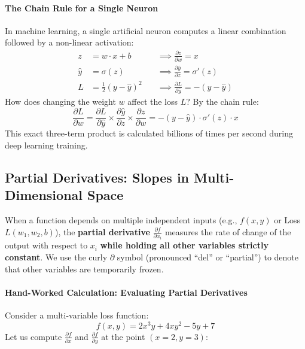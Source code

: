 \paragraph{The Chain Rule for a Single Neuron}
In machine learning, a single artificial neuron computes a linear combination followed by a non-linear activation:
\begin{align*}
z &= w \cdot x + b \quad &\implies \frac{\partial z}{\partial w} = x \\
\hat{y} &= \sigma(z) \quad &\implies \frac{\partial \hat{y}}{\partial z} = \sigma'(z) \\
L &= \frac{1}{2}(y - \hat{y})^2 \quad &\implies \frac{\partial L}{\partial \hat{y}} = -(y - \hat{y})
\end{align*}
How does changing the weight $w$ affect the loss $L$? By the chain rule:
\begin{equation}
\frac{\partial L}{\partial w} = \frac{\partial L}{\partial \hat{y}} \times \frac{\partial \hat{y}}{\partial z} \times \frac{\partial z}{\partial w} = -(y - \hat{y}) \cdot \sigma'(z) \cdot x\label{eq:neuron_backprop}
\end{equation}
This exact three-term product is calculated billions of times per second during deep learning training.

\subsection{Partial Derivatives: Slopes in Multi-Dimensional Space}

\begin{keyidea}
When a function depends on multiple independent inputs (e.g., $f(x, y)$ or Loss $L(w_1, w_2, b)$), the \textbf{partial derivative} $\frac{\partial f}{\partial x_i}$ measures the rate of change of the output with respect to $x_i$ \textbf{while holding all other variables strictly constant}. We use the curly $\partial$ symbol (pronounced ``del'' or ``partial'') to denote that other variables are temporarily frozen.
\end{keyidea}

\paragraph{Hand-Worked Calculation: Evaluating Partial Derivatives}
Consider a multi-variable loss function:
\begin{equation*}
f(x, y) = 2x^3 y + 4x y^2 - 5y + 7
\end{equation*}
Let us compute $\frac{\partial f}{\partial x}$ and $\frac{\partial f}{\partial y}$ at the point $(x = 2, y = 3)$:

